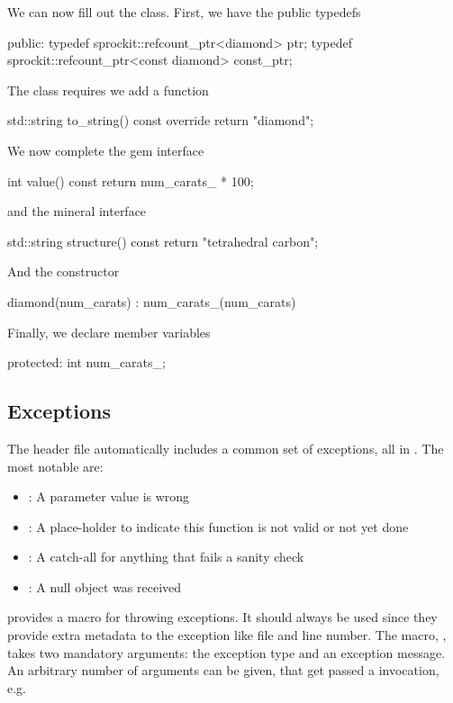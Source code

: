 We can now fill out the class.  First, we have the public typedefs

\begin{CppCode}
 public:
  typedef sprockit::refcount_ptr<diamond> ptr;
  typedef sprockit::refcount_ptr<const diamond> const_ptr;
\end{CppCode}


The  class requires we add a  function

\begin{CppCode}
std::string
to_string() const override {
  return "diamond";
}
\end{CppCode}

We now complete the gem interface

\begin{CppCode}
int
value() const {
  return num_carats_ * 100;
}
\end{CppCode}

and the mineral interface
\begin{CppCode}
std::string
structure() const {
  return "tetrahedral carbon";
}
\end{CppCode}

And the constructor

\begin{CppCode}
  diamond(num_carats)
   : num_carats_(num_carats)
{
}
\end{CppCode}

Finally, we declare member variables
\begin{CppCode}
 protected:
  int num_carats_;
\end{CppCode}


\subsection{Exceptions}
\label{classes:style:basic:exceptions}

The  header file automatically includes a common set of exceptions, all in .
The most notable are:
\begin{itemize}
\item {}: A parameter value is wrong
\item {}: A place-holder to indicate this function is not valid or not yet done
\item {}: A catch-all for anything that fails a sanity check
\item {}: A null object was received
\end{itemize}
\sprockit provides a macro for throwing exceptions.
It should always be used since they provide extra metadata to the exception like file and line number.
The macro, , takes two mandatory arguments: the exception type and an exception message.
An arbitrary number of arguments can be given, that get passed a  invocation, e.g.

